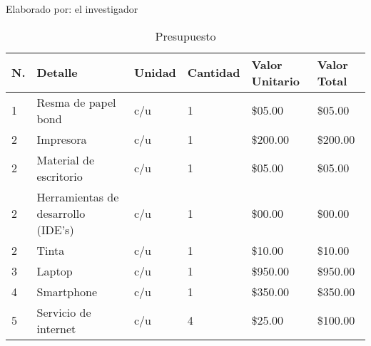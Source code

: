 \begin{ThreePartTable}
	\begin{TableNotes}[flushleft]
		\centering
		\item Elaborado por: el investigador
	\end{TableNotes}
	\begin{longtable}{|l |p{}| l| l| p{}| p{}|}
		\caption{Presupuesto}
		\label{table:presupuesto}                                                                                                                                                     \\
		\hline
		\textbf{N.}                                       & \textbf{Detalle}                   & \textbf{Unidad} & \textbf{Cantidad} & \textbf{Valor Unitario} & \textbf{Valor Total} \\
		\hline
		1                                                 & Resma de papel bond                & c/u             & 1                 & \$05.00                 & \$05.00              \\
		2                                                 & Impresora                          & c/u             & 1                 & \$200.00                & \$200.00             \\
		2                                                 & Material de escritorio             & c/u             & 1                 & \$05.00                 & \$05.00              \\
		2                                                 & Herramientas de desarrollo (IDE's) & c/u             & 1                 & \$00.00                 & \$00.00              \\
		2                                                 & Tinta                              & c/u             & 1                 & \$10.00                 & \$10.00              \\
		3                                                 & Laptop                             & c/u             & 1                 & \$950.00                & \$950.00             \\
		4                                                 & Smartphone                         & c/u             & 1                 & \$350.00                & \$350.00             \\
		5                                                 & Servicio de internet               & c/u             & 4                 & \$25.00                 & \$100.00             \\

\end{longtable}
\end{ThreePartTable}
